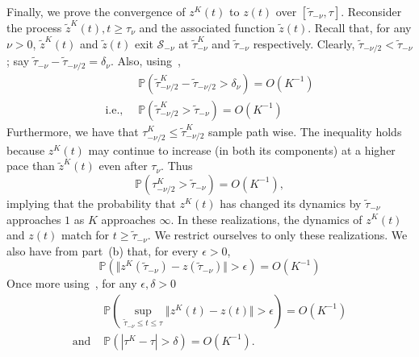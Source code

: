 \documentclass[10pt,journal,letterpaper]{IEEEtran}
\begin{document}
\begin{inparaenum}[(a)]
{}
\item Finally, we prove the convergence of $z^K(t)$ to $z(t)$ over
$[\tilde{\tau}_{-\nu},\tau]$. Reconsider the process
$\tilde{z}^K(t), t \geq \tau_{\nu}$ and the associated function
$\tilde{z}(t)$. Recall that, for any $\nu > 0$, $\tilde{z}^K(t)$ and
$\tilde{z}(t)$ exit $\mathcal{S}_{-\nu}$ at $\tilde{\tau}^K_{-\nu}$
and $\tilde{\tau}_{-\nu}$ respectively. Clearly,
$\tilde{\tau}_{-\nu/2} < \tilde{\tau}_{-\nu}$; say
$\tilde{\tau}_{-\nu} - \tilde{\tau}_{-\nu/2} = \delta_{\nu}$. Also,
using~\cite[Theorem~2.8]{stochproc.darling02fluid-limits},
\begin{align*}
&~ \mathbb{P}\left(\tilde{\tau}^K_{-\nu/2}- \tilde{\tau}_{-\nu/2} > \delta_{\nu}\right) = O(K^{-1})\\
\mbox{i.e., } &~ \mathbb{P}\left(\tilde{\tau}^K_{-\nu/2} >  \tilde{\tau}_{-\nu} \right) = O(K^{-1})
\end{align*}
Furthermore, we have that $\tau^K_{-\nu/2} \leq
\tilde{\tau}^K_{-\nu/2}$ sample path wise. The  inequality holds
because $z^K(t)$ may continue to increase (in both its components)
at a higher pace than $\tilde{z}^K(t)$ even after $\tau_{\nu}$. Thus
\[\mathbb{P}\left(\tau^K_{-\nu/2} > \tilde{\tau}_{-\nu} \right) = O(K^{-1}),\]
implying that the probability that  $z^K(t)$ has changed its
dynamics by $\tilde{\tau}_{-\nu}$ approaches $1$ as $K$ approaches
$\infty$. In these realizations, the dynamics of $z^K(t)$ and $z(t)$
match for $t \geq \tilde{\tau}_{-\nu}$. We restrict ourselves to
only these realizations. We also have from part~(b) that, for every
$\epsilon
> 0$,
\[
\mathbb{P}\left(\Vert z^K(\tilde{\tau}_{-\nu})- z(\tilde{\tau}_{-\nu}) \Vert > \epsilon \right) = O(K^{-1})
\]
Once more using~\cite[Theorem~2.8]{stochproc.darling02fluid-limits}, for any $\epsilon,\delta > 0$
\begin{align*}
& \mathbb{P}\left(\sup_{\tilde{\tau}_{-\nu} \leq t \leq \tau} \Vert
z^K(t)- z(t) \Vert > \epsilon \right) = O(K^{-1}) \\
\mbox{and } & \mathbb{P}\left(|\tau^K - \tau| > \delta \right) = O(K^{-1}).
\end{align*}

\end{inparaenum}
\end{document}
